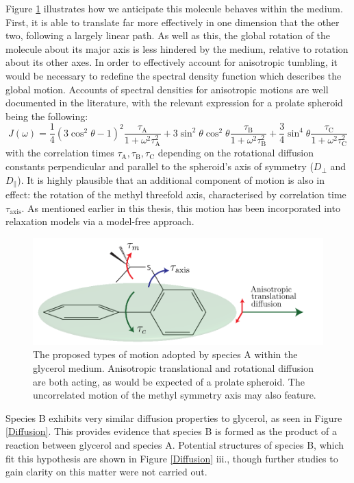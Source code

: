 Figure \ref{AnisotropicMotion} illustrates how we anticipate this molecule behaves within the medium. First, it is able to translate far more effectively in one dimension that the other two, following a largely linear path. As well as this, the global rotation of the molecule about its major axis is less hindered by the medium, relative to rotation about its other axes. In order to effectively account for anisotropic tumbling, it would be necessary to redefine the spectral density function which describes the global motion. Accounts of spectral densities for anisotropic motions are well documented in the literature, with the relevant expression for a prolate spheroid being the following\cite{RN53}:
\begin{equation}
J(\omega) = \frac{1}{4}\left(3\cos^2\theta-1\right)^2 \frac{\tau_{\text{A}}}{1+ \omega^2\tau_{\text{A}}^2} + 3\sin^2\theta\cos^2\theta \frac{\tau_{\text{B}}}{1+ \omega^2\tau_{\text{B}}^2} + \frac{3}{4}\sin^4\theta\frac{\tau_{\text{C}}}{1+ \omega^2\tau_{\text{C}}^2}
\end{equation}
with the correlation times $\tau_{\text{A}}, \tau_{\text{B}}, \tau_{\text{C}}$ depending on the rotational diffusion constants perpendicular and parallel to the spheroid's axis of symmetry ($D_{\perp}$ and $D_{\parallel}$). It is highly plausible that an additional component of motion is also in effect: the rotation of the methyl threefold axis, characterised by correlation time $\tau_{\text{axis}}$. As mentioned earlier in this thesis, this motion has been incorporated into relaxation models via a model-free approach\cite{RN31}.\\
\begin{figure}
\centering
\includegraphics[scale=0.8]{./Figures/SimonsFigs/SpeciesAMotion.pdf}
\caption{The proposed types of motion adopted by species A within the glycerol medium. Anisotropic translational and rotational diffusion are both acting, as would be expected of a prolate spheroid. The uncorrelated motion of the methyl symmetry axis may also feature.}
\label{AnisotropicMotion}
\end{figure}
Species B exhibits very similar diffusion properties to glycerol, as seen in Figure \ref{Diffusion}. This provides evidence that species B is formed as the product of a reaction between glycerol and species A. Potential structures of species B, which fit this hypothesis are shown in Figure \ref{Diffusion} iii., though further studies to gain clarity on this matter were not carried out.
